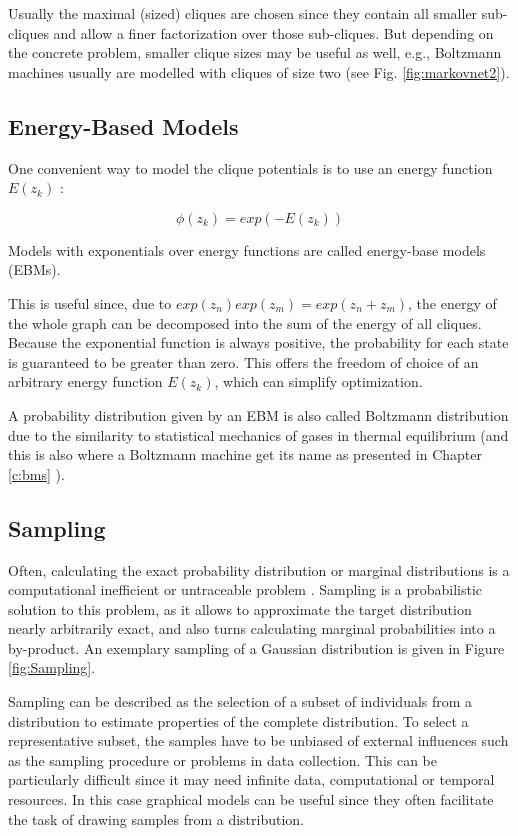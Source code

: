 Usually the maximal (sized) cliques are chosen since they contain all smaller sub-cliques and allow a finer factorization over those sub-cliques.
But depending on the concrete problem, smaller clique sizes may be useful as well, e.g., Boltzmann machines usually are modelled with cliques of size two (see Fig. \ref{fig:markovnet2}).




\subsection{Energy-Based Models} \label{c:ebms}

One convenient way to model the clique potentials is to use an energy function $E(z_k)$ \cite{Goodfellow-et-al-2016-Book}: 

\[
\phi(z_k) = exp(- E(z_k))
\]

Models with exponentials over energy functions are called energy-base models (EBMs).

This is useful since, due to $exp(z_n)exp(z_m) = exp(z_n+z_m)$, the energy of the whole graph can be decomposed into the sum of the energy of all cliques.
Because the exponential function is always positive, the probability for each state is guaranteed to be greater than zero. 
This offers the freedom of choice of an arbitrary energy function $E(z_k)$, which can simplify optimization. 

A probability distribution given by an EBM is also called Boltzmann distribution due to the similarity to statistical mechanics of gases in thermal equilibrium (and this is also where a Boltzmann machine get its name as presented in Chapter \ref{c:bms} ).

\subsection{Sampling} \label{c:sampling}

Often, calculating the exact probability distribution or marginal distributions is a computational inefficient or untraceable problem \cite{Goodfellow-et-al-2016-Book}\cite{Petrovici2016}.
Sampling is a probabilistic solution to this problem, as it allows to approximate the target distribution nearly arbitrarily exact, and also turns calculating marginal probabilities into a by-product.  
An exemplary sampling of a Gaussian distribution is given in Figure \ref{fig:Sampling}.

Sampling can be described as the selection of a subset of individuals from a distribution to estimate properties of the complete distribution.
To select a representative subset, the samples have to be unbiased of external influences such as the sampling procedure or problems in data collection.
This can be particularly difficult since it may need infinite data, computational or temporal resources.
In this case graphical models can be useful since they often facilitate the task of drawing samples from a distribution.


